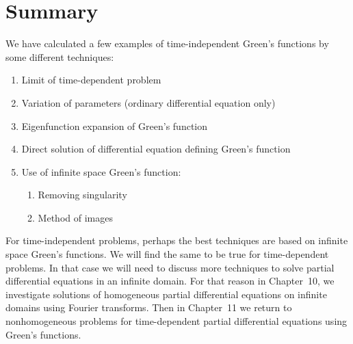 \section{Summary}
\label{sec:greens-summary}

We have calculated a few examples of time-independent Green's functions by some different techniques:
\begin{enumerate}
\item Limit of time-dependent problem
\item Variation of parameters (ordinary differential equation only)
\item Eigenfunction expansion of Green's function
\item Direct solution of differential equation defining Green's function
\item Use of infinite space Green's function:
\begin{enumerate}
\item[a.] Removing singularity
\item[b.] Method of images
\end{enumerate}
\end{enumerate}

For time-independent problems, perhaps the best techniques are based on infinite space Green's functions.  We will find the same to be true for time-dependent problems.  In that case we will need to discuss more techniques to solve partial differential equations in an infinite domain.  For that reason in Chapter~10, we investigate solutions of homogeneous partial differential equations on infinite domains using Fourier transforms.  Then in Chapter~11 we return to nonhomogeneous problems for time-dependent partial differential equations using Green's functions.
